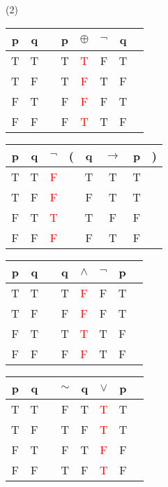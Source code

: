 \begin{Solution}{1.2}
\quad
   \begin{tasks}(2)
     \task
	\begin{tabular}{@{ }c@{ }@{ }c | c@{ }@{ }c@{ }@{ }c@{ }@{ }c@{ }@{ }c@{ }@{ }c}
	p & q &  & p & $\oplus$ & $\lnot$ & q & \\
	\hline
	T & T &  & T & \textcolor{red}{T} & F & T & \\
	T & F &  & T & \textcolor{red}{F} & T & F & \\
	F & T &  & F & \textcolor{red}{F} & F & T & \\
	F & F &  & F & \textcolor{red}{T} & T & F & \\
	\end{tabular}

      \task
         \begin{tabular}{@{ }c@{ }@{ }c | c@{ }@{}c@{}@{ }c@{ }@{ }c@{ }@{ }c@{ }@{}c@{ }}
              p & q & $\lnot$ & ( & q & $\rightarrow$ & p & )\\
              \hline
             T & T & \textcolor{red}{F} &  & T & T & T & \\
            T & F & \textcolor{red}{F} &  & F & T & T & \\
           F & T & \textcolor{red}{T} &  & T & F & F & \\
          F & F & \textcolor{red}{F} &  & F & T & F & \\
      \end{tabular}

    \task
       \begin{tabular}{@{ }c@{ }@{ }c | c@{ }@{ }c@{ }@{ }c@{ }@{ }c@{ }@{ }c@{ }@{ }c}
	p & q &  & q & $\land$ & $\lnot$ & p & \\
	\hline
	T & T &  & T & \textcolor{red}{F} & F & T & \\
	T & F &  & F & \textcolor{red}{F} & F & T & \\
	F & T &  & T & \textcolor{red}{T} & T & F & \\
	F & F &  & F & \textcolor{red}{F} & T & F & \\
    \end{tabular}

  \task
     \begin{tabular}{@{ }c@{ }@{ }c | c@{ }@{ }c@{ }@{ }c@{ }@{ }c@{ }@{ }c@{ }@{ }c}
	p & q &  & $\sim$ & q & $\lor$ & p & \\
	\hline
	T & T &  & F & T & \textcolor{red}{T} & T & \\
	T & F &  & T & F & \textcolor{red}{T} & T & \\
	F & T &  & F & T & \textcolor{red}{F} & F & \\
	F & F &  & T & F & \textcolor{red}{T} & F & \\
   \end{tabular}


\end{tasks}
\end{Solution}
